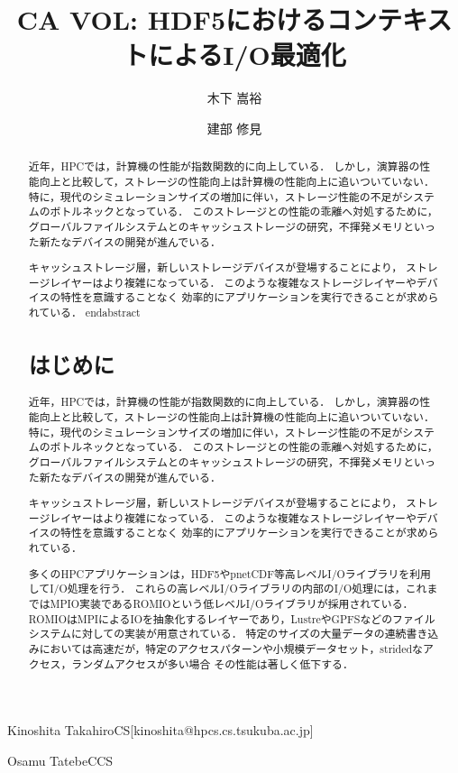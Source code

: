 \documentclass[submit,techrep,noauthor]{ipsj}
\begin{document}

\title{CA VOL: HDF5におけるコンテキストによるI/O最適化}

\author{木下 嵩裕}{Kinoshita Takahiro}{CS}[kinoshita@hpcs.cs.tsukuba.ac.jp]
\author{建部 修見}{Osamu Tatebe}{CCS}

\begin{abstract}
近年，HPCでは，計算機の性能が指数関数的に向上している．
しかし，演算器の性能向上と比較して，ストレージの性能向上は計算機の性能向上に追いついていない．
特に，現代のシミュレーションサイズの増加に伴い，ストレージ性能の不足がシステムのボトルネックとなっている．
このストレージとの性能の乖離へ対処するために，
グローバルファイルシステムとのキャッシュストレージの研究，不揮発メモリといった新たなデバイスの開発が進んでいる．

キャッシュストレージ層，新しいストレージデバイスが登場することにより，
ストレージレイヤーはより複雑になっている．
このような複雑なストレージレイヤーやデバイスの特性を意識することなく
効率的にアプリケーションを実行できることが求められている．
end{abstract}

\maketitle

\section{はじめに}
近年，HPCでは，計算機の性能が指数関数的に向上している．
しかし，演算器の性能向上と比較して，ストレージの性能向上は計算機の性能向上に追いついていない．
特に，現代のシミュレーションサイズの増加に伴い，ストレージ性能の不足がシステムのボトルネックとなっている．
このストレージとの性能の乖離へ対処するために，
グローバルファイルシステムとのキャッシュストレージの研究，不揮発メモリといった新たなデバイスの開発が進んでいる．

キャッシュストレージ層，新しいストレージデバイスが登場することにより，
ストレージレイヤーはより複雑になっている．
このような複雑なストレージレイヤーやデバイスの特性を意識することなく
効率的にアプリケーションを実行できることが求められている．

多くのHPCアプリケーションは，HDF5やpnetCDF等高レベルI/Oライブラリを利用してI/O処理を行う．
これらの高レベルI/Oライブラリの内部のI/O処理には，これまではMPIO実装であるROMIOという低レベルI/Oライブラリが採用されている．
ROMIOはMPIによるIOを抽象化するレイヤーであり，LustreやGPFSなどのファイルシステムに対しての実装が用意されている．
特定のサイズの大量データの連続書き込みにおいては高速だが，特定のアクセスパターンや小規模データセット，stridedなアクセス，ランダムアクセスが多い場合
その性能は著しく低下する．


\end{abstract}
\end{document}
